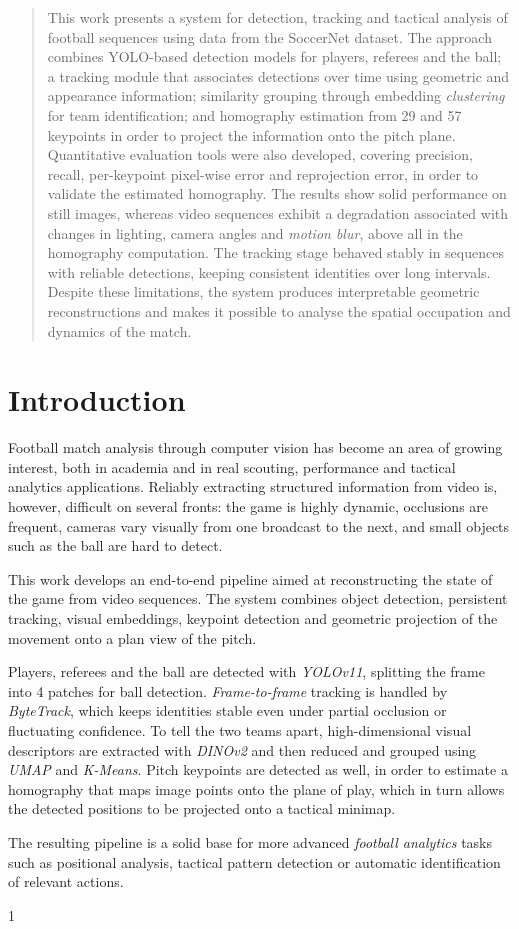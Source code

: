 \vspace{0.5cm}

\begin{abstract}
This work presents a system for detection, tracking and tactical analysis of football sequences using data from the SoccerNet dataset. The approach combines YOLO-based detection models for players, referees and the ball; a tracking module that associates detections over time using geometric and appearance information; similarity grouping through embedding \textit{clustering} for team identification; and homography estimation from 29 and 57 keypoints in order to project the information onto the pitch plane. Quantitative evaluation tools were also developed, covering precision, recall, per-keypoint pixel-wise error and reprojection error, in order to validate the estimated homography. The results show solid performance on still images, whereas video sequences exhibit a degradation associated with changes in lighting, camera angles and \textit{motion blur}, above all in the homography computation. The tracking stage behaved stably in sequences with reliable detections, keeping consistent identities over long intervals. Despite these limitations, the system produces interpretable geometric reconstructions and makes it possible to analyse the spatial occupation and dynamics of the match.

\end{abstract}


\section{Introduction} \label{section: introduction}

Football match analysis through computer vision has become an area of growing interest, both in academia and in real scouting, performance and tactical analytics applications. Reliably extracting structured information from video is, however, difficult on several fronts: the game is highly dynamic, occlusions are frequent, cameras vary visually from one broadcast to the next, and small objects such as the ball are hard to detect.

This work develops an end-to-end pipeline aimed at reconstructing the state of the game from video sequences. The system combines object detection, persistent tracking, visual embeddings, keypoint detection and geometric projection of the movement onto a plan view of the pitch.

Players, referees and the ball are detected with \textit{YOLOv11}, splitting the frame into 4 patches for ball detection. \textit{Frame-to-frame} tracking is handled by \textit{ByteTrack}, which keeps identities stable even under partial occlusion or fluctuating confidence. To tell the two teams apart, high-dimensional visual descriptors are extracted with \textit{DINOv2} and then reduced and grouped using \textit{UMAP} and \textit{K-Means}. Pitch keypoints are detected as well, in order to estimate a homography that maps image points onto the plane of play, which in turn allows the detected positions to be projected onto a tactical minimap.

The resulting pipeline is a solid base for more advanced \textit{football analytics} tasks such as positional analysis, tactical pattern detection or automatic identification of relevant actions.

\begin{relsize}{1}

\end{relsize}
